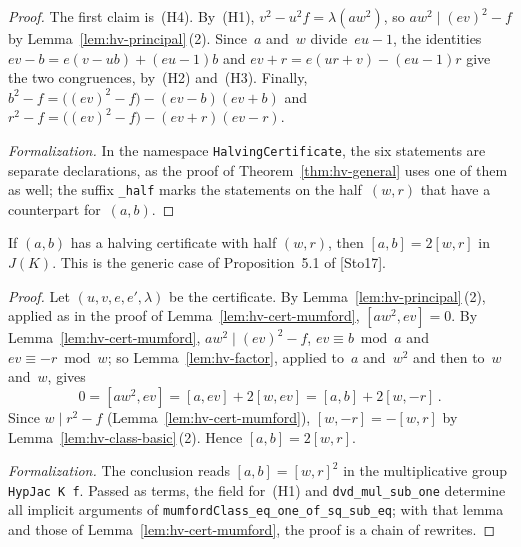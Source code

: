 \begin{proof}
\leanok
{}
The first claim is~(H4). By~(H1), $v^2 - u^2 f = \lambda (a w^2)$, so
$a w^2 \mid (ev)^2 - f$ by Lemma~\ref{lem:hv-principal}\,(2). Since~$a$ and~$w$ divide~$eu - 1$,
the identities $ev - b = e(v - ub) + (eu - 1)b$ and $ev + r = e(ur + v) - (eu - 1)r$ give the two
congruences, by~(H2) and~(H3). Finally,
$b^2 - f = \bigl((ev)^2 - f\bigr) - (ev - b)(ev + b)$ and
$r^2 - f = \bigl((ev)^2 - f\bigr) - (ev + r)(ev - r)$.

\emph{Formalization.} In the namespace \texttt{HalvingCertificate}, the six statements are
separate declarations, as the proof of Theorem~\ref{thm:hv-general} uses one of them as well; the
suffix \texttt{\_half} marks the statements on the half~$(w, r)$ that have a counterpart
for~$(a, b)$.
\end{proof}

\begin{theorem}
\label{thm:hv-generic}
\leanok
{}
If $(a, b)$ has a halving certificate with half $(w, r)$, then $[a, b] = 2[w, r]$ in~$J(K)$. This
is the generic case of Proposition~5.1 of [Sto17].
\end{theorem}

\begin{proof}
\leanok
{}
Let $(u, v, e, e', \lambda)$ be the certificate. By Lemma~\ref{lem:hv-principal}\,(2), applied as
in the proof of Lemma~\ref{lem:hv-cert-mumford}, $[a w^2, ev] = 0$. By
Lemma~\ref{lem:hv-cert-mumford}, $a w^2 \mid (ev)^2 - f$, $ev \equiv b \bmod a$ and
$ev \equiv -r \bmod w$; so Lemma~\ref{lem:hv-factor}, applied to~$a$ and~$w^2$ and then to~$w$
and~$w$, gives
\[ 0 = [a w^2, ev] = [a, ev] + 2[w, ev] = [a, b] + 2[w, -r]\,. \]
Since $w \mid r^2 - f$ (Lemma~\ref{lem:hv-cert-mumford}), $[w, -r] = -[w, r]$ by
Lemma~\ref{lem:hv-class-basic}\,(2). Hence $[a, b] = 2[w, r]$.

\emph{Formalization.} The conclusion reads $[a, b] = [w, r]^2$ in the multiplicative group
\texttt{HypJac K f}. Passed as terms, the field for~(H1) and \texttt{dvd\_mul\_sub\_one} determine
all implicit arguments of \texttt{mumfordClass\_eq\_one\_of\_sq\_sub\_eq}; with that lemma and those
of Lemma~\ref{lem:hv-cert-mumford}, the proof is a chain of rewrites.
\end{proof}

